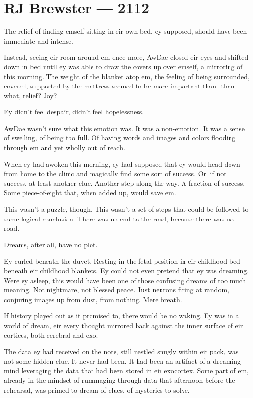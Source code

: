 \hypertarget{rj-brewster-2112}{%
\chapter*{RJ Brewster — 2112}\label{rj-brewster-2112}}

The relief of finding emself sitting in eir own bed, ey supposed, should have been immediate and intense.

Instead, seeing eir room around em once more, AwDae closed eir eyes and shifted down in bed until ey was able to draw the covers up over emself, a mirroring of this morning. The weight of the blanket atop em, the feeling of being surrounded, covered, supported by the mattress seemed to be more important than\ldots{}than what, relief? Joy?

Ey didn't feel despair, didn't feel hopelessness.

AwDae wasn't sure what this emotion was. It was a non-emotion. It was a sense of swelling, of being too full. Of having words and images and colors flooding through em and yet wholly out of reach.

When ey had awoken this morning, ey had supposed that ey would head down from home to the clinic and magically find some sort of success. Or, if not success, at least another clue. Another step along the way. A fraction of success. Some piece-of-eight that, when added up, would save em.

This wasn't a puzzle, though. This wasn't a set of steps that could be followed to some logical conclusion. There was no end to the road, because there was no road.

Dreams, after all, have no plot.

Ey curled beneath the duvet. Resting in the fetal position in eir childhood bed beneath eir childhood blankets. Ey could not even pretend that ey was dreaming. Were ey asleep, this would have been one of those confusing dreams of too much meaning. Not nightmare, not blessed peace. Just neurons firing at random, conjuring images up from dust, from nothing. Mere breath.

If history played out as it promised to, there would be no waking. Ey was in a world of dream, eir every thought mirrored back against the inner surface of eir cortices, both cerebral and exo.

The data ey had received on the note, still nestled snugly within eir pack, was not some hidden clue. It never had been. It had been an artifact of a dreaming mind leveraging the data that had been stored in eir exocortex. Some part of em, already in the mindset of rummaging through data that afternoon before the rehearsal, was primed to dream of clues, of mysteries to solve.


